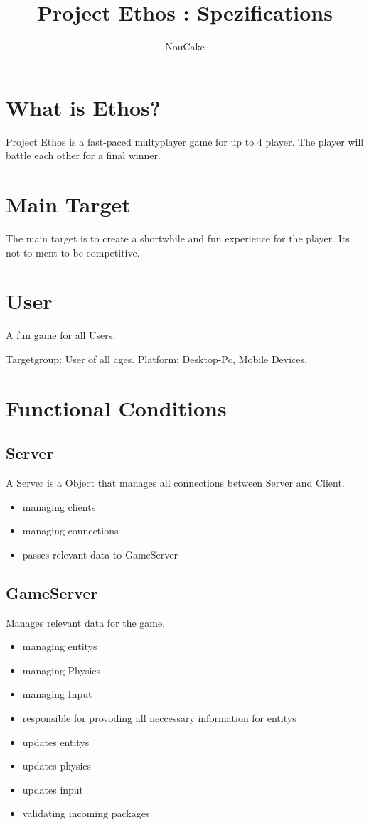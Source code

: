 \documentclass[parskip=full]{scrartcl}
\title{Project Ethos : Spezifications}
\author{NouCake}
\begin{document}
\maketitle

\section{What is Ethos?}
Project Ethos is a fast-paced multyplayer game for up to 4 player. The player will battle each other for a final winner.

\section{Main Target}
The main target is to create a shortwhile and fun experience for the player. Its not to ment to be competitive.

\section{User}
A fun game for all Users.

Targetgroup: User of all ages.\newline 
Platform: Desktop-Pc, Mobile Devices.

\newpage
\section{Functional Conditions}
\subsection{Server}
A Server is a Object that manages all connections between Server and Client.
\begin{itemize}
	\item managing clients
	\item managing connections
	\item passes relevant data to GameServer
\end{itemize}

\subsection{GameServer}
Manages relevant data for the game.
\begin{itemize}
	\item managing entitys
	\item managing Physics
	\item managing Input
	\item responsible for provoding all neccessary information for entitys
	\item updates entitys
	\item updates physics
	\item updates input
	\item validating incoming packages
\end{itemize}
\end{document}
